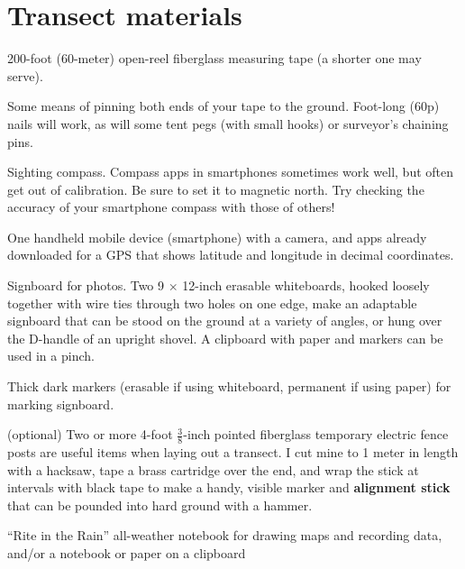 \documentclass[11pt,letterpaper,twoside,onecolumn]{memoir}
\begin{document}
\section*{Transect materials}
\begin{checkboxlist}
 \item 200-foot (60-meter) open-reel fiberglass measuring tape (a shorter one may serve).
\item Some means of pinning both ends of your tape to the ground. Foot-long (60p) nails will work, as will some tent pegs (with small hooks) or surveyor's chaining pins.
\item Sighting compass. Compass apps in smartphones sometimes work well, but often get out of calibration. Be sure to set it to magnetic north. Try checking the accuracy of your smartphone compass with those of others!
\item One handheld mobile device (smartphone) with a camera, and apps already downloaded for a GPS that shows latitude and longitude in decimal coordinates. 

\item Signboard for photos. Two 9 $\times$  12-inch erasable whiteboards, hooked loosely together with wire ties through two holes on one edge, make an adaptable signboard that can be stood on the ground at a variety of angles, or hung over the D-handle of an upright shovel. A clipboard with paper and markers can be used in a pinch.
\item Thick dark markers (erasable if using whiteboard, permanent if using paper) for marking signboard.
\item (optional) Two or more 4-foot $\frac{3}{8}$-inch pointed fiberglass temporary electric fence posts are useful items when laying out a transect. I cut mine to 1 meter in length with a hacksaw, tape a brass cartridge over the end, and wrap the stick at intervals with black tape to make a handy, visible marker and \textbf{alignment stick} that can be pounded into hard ground with a hammer.
\item ``Rite in the Rain'' all-weather notebook for drawing maps and recording data, and/or a notebook or paper on a clipboard
\end{checkboxlist}
\end{document}
